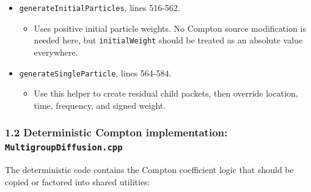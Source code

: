 \documentclass[
]{article}
\providecommand{\tightlist}{%
  \setlength{\itemsep}{0pt}\setlength{\parskip}{0pt}}
\begin{document}
\begin{itemize}
  \begin{itemize}
  \tightlist
  \item
    Allocates \texttt{factorFleck}, \texttt{planckOpacities}, and
    estimators at lines 459-467.
  \item
    Computes the current Fleck factor at lines 472-491 using only Planck
    absorption. This must be replaced by the Compton-modified Fleck
    factor when Compton is enabled.
  \item
    Calls \texttt{generateParticles(fullDt)} at line 500.
  \end{itemize}
\item
  \texttt{generateInitialParticles}, lines 516-562.

  \begin{itemize}
  \tightlist
  \item
    Uses positive initial particle weights. No Compton source
    modification is needed here, but \texttt{initialWeight} should be
    treated as an absolute value everywhere.
  \end{itemize}
\item
  \texttt{generateSingleParticle}, lines 564-584.

  \begin{itemize}
  \tightlist
  \item
    Use this helper to create residual child packets, then override
    location, time, frequency, and signed weight.
  \end{itemize}
\end{itemize}

\subsubsection{\texorpdfstring{1.2 Deterministic Compton implementation:
\texttt{MultigroupDiffusion.cpp}}{1.2 Deterministic Compton implementation: MultigroupDiffusion.cpp}}\label{deterministic-compton-implementation-multigroupdiffusion.cpp}

The deterministic code contains the Compton coefficient logic that
should be copied or factored into shared utilities:
\end{document}
